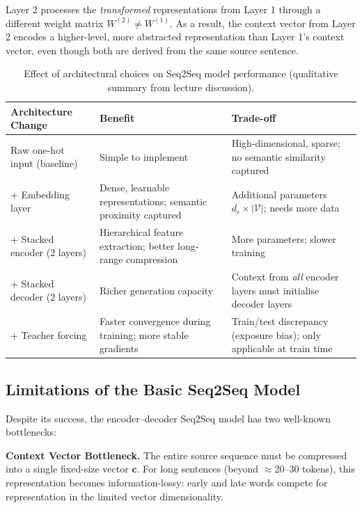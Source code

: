 \documentclass[12pt,a4paper]{article}
\begin{document}
Layer 2 processes the \emph{transformed} representations from Layer 1 through
a different weight matrix $W^{(2)} \neq W^{(1)}$.  As a result, the context
vector from Layer 2 encodes a higher-level, more abstracted representation than
Layer 1's context vector, even though both are derived from the same source
sentence.

\begin{table}[ht]
\centering
\caption{Effect of architectural choices on Seq2Seq model performance
         (qualitative summary from lecture discussion).}
\label{tab:seq2seq_ablation}
\begin{tabularx}{\textwidth}{lXX}
\toprule
\textbf{Architecture Change} & \textbf{Benefit} & \textbf{Trade-off} \\
\midrule
Raw one-hot input (baseline) &
  Simple to implement &
  High-dimensional, sparse; no semantic similarity captured \\
\addlinespace
+ Embedding layer &
  Dense, learnable representations; semantic proximity captured &
  Additional parameters $d_e \times |\mathcal{V}|$; needs more data \\
\addlinespace
+ Stacked encoder (2 layers) &
  Hierarchical feature extraction; better long-range compression &
  More parameters; slower training \\
\addlinespace
+ Stacked decoder (2 layers) &
  Richer generation capacity &
  Context from \emph{all} encoder layers must initialise decoder layers \\
\addlinespace
+ Teacher forcing &
  Faster convergence during training; more stable gradients &
  Train/test discrepancy (exposure bias); only applicable at train time \\
\bottomrule
\end{tabularx}
\end{table}

\subsection{Limitations of the Basic Seq2Seq Model}
\label{subsec:seq2seq_limitations}

Despite its success, the encoder--decoder Seq2Seq model has two well-known
bottlenecks:

\begin{warningbox}
  \textbf{Context Vector Bottleneck.}  The entire source sequence must be
  compressed into a single fixed-size vector $\mathbf{c}$.  For long
  sentences (beyond $\approx$20--30 tokens), this representation becomes
  information-lossy: early and late words compete for representation in
  the limited vector dimensionality.
\end{warningbox}
\end{document}
